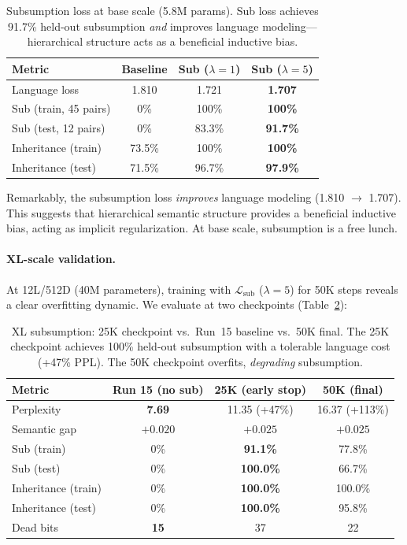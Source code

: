 \documentclass[11pt,a4paper]{article}
\newcommand{\loss}[1]{\mathcal{L}_{\text{#1}}}
\begin{document}
\begin{table}[h]
\centering
\caption{Subsumption loss at base scale (5.8M params). Sub loss achieves 91.7\% held-out subsumption \emph{and} improves language modeling---hierarchical structure acts as a beneficial inductive bias.}
\label{tab:sub_base}
\begin{tabular}{lccc}
\toprule
Metric & Baseline & Sub ($\lambda=1$) & Sub ($\lambda=5$) \\
\midrule
Language loss         & 1.810  & 1.721  & \textbf{1.707} \\
Sub (train, 45 pairs) & 0\%    & 100\%  & \textbf{100\%} \\
Sub (test, 12 pairs)  & 0\%    & 83.3\% & \textbf{91.7\%} \\
Inheritance (train)   & 73.5\% & 100\%  & \textbf{100\%} \\
Inheritance (test)    & 71.5\% & 96.7\% & \textbf{97.9\%} \\
\bottomrule
\end{tabular}
\end{table}

Remarkably, the subsumption loss \emph{improves} language modeling (1.810 $\rightarrow$ 1.707). This suggests that hierarchical semantic structure provides a beneficial inductive bias, acting as implicit regularization. At base scale, subsumption is a free lunch.

\paragraph{XL-scale validation.} At 12L/512D (40M parameters), training with $\loss{sub}$ ($\lambda=5$) for 50K steps reveals a clear overfitting dynamic. We evaluate at two checkpoints (Table~\ref{tab:sub_xl}):

\begin{table}[h]
\centering
\caption{XL subsumption: 25K checkpoint vs.\ Run~15 baseline vs.\ 50K final. The 25K checkpoint achieves 100\% held-out subsumption with a tolerable language cost (+47\% PPL). The 50K checkpoint overfits, \emph{degrading} subsumption.}
\label{tab:sub_xl}
\begin{tabular}{lccc}
\toprule
Metric & Run 15 (no sub) & 25K (early stop) & 50K (final) \\
\midrule
Perplexity        & \textbf{7.69}  & 11.35 (+47\%)  & 16.37 (+113\%) \\
Semantic gap      & $+0.020$       & $\mathbf{+0.025}$ & $+0.025$ \\
Sub (train)       & 0\%            & \textbf{91.1\%}   & 77.8\% \\
Sub (test)        & 0\%            & \textbf{100.0\%}  & 66.7\% \\
Inheritance (train) & 0\%          & \textbf{100.0\%}  & 100.0\% \\
Inheritance (test)  & 0\%          & \textbf{100.0\%}  & 95.8\% \\
Dead bits         & \textbf{15}    & 37               & 22 \\
\bottomrule
\end{tabular}
\end{table}
\end{document}
